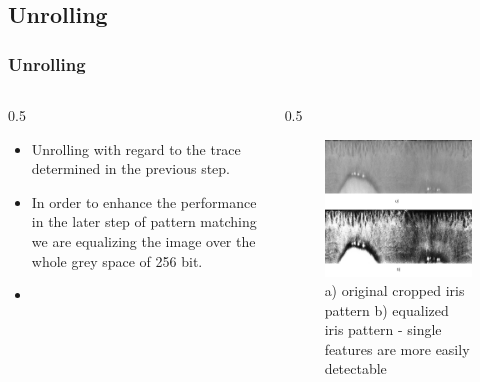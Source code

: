 \documentclass{beamer}
\begin{document}
\subsection{Unrolling} 
\begin{frame}
	[fragile] \frametitle{Unrolling} 
	\begin{columns}
		\begin{column}
			{0.5
			\textwidth} 
			\begin{itemize}
				\item Unrolling with regard to the trace determined in the previous step. 
				\item In order to enhance the performance in the later step of pattern matching we are equalizing the image over the whole grey space of 256 bit. 
				\item 
			\end{itemize}
		\end{column}
		\begin{column}
			{0.5
			\textwidth} 
			\begin{figure}
				[ht] \centering 
				\includegraphics[width=0.99
				\textwidth]{../report/iris/iris_unrolled.png} \caption{a) original cropped iris pattern b) equalized iris pattern - single features are more easily detectable} \label{fig:unrolled_iris} 
			\end{figure}
		\end{column}
	\end{columns}
\end{frame}
\end{document}
